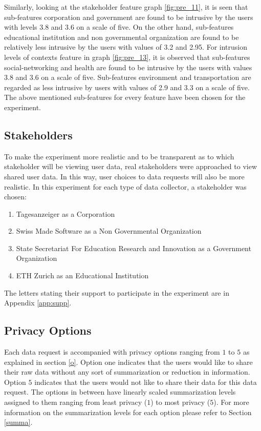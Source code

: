 Similarly, looking at the stakeholder feature graph \ref{fig:pre_11}, it is seen that sub-features  corporation and government are found to be intrusive by the users with levels 3.8 and 3.6 on a scale of five. On the other hand, sub-features educational institution and non governmental organization are found to be relatively less intrusive by the users with values of 3.2 and 2.95. For intrusion levels of contexts feature in graph \ref{fig:pre_13}, it is observed that sub-features social-networking and health are found to be intrusive by the users with values 3.8 and 3.6 on a scale of five. Sub-features environment and
transportation are regarded as less intrusive by users with values of 2.9 and 3.3 on a scale of five. The above mentioned sub-features for every feature have been chosen for the experiment.

\subsection{Stakeholders} \label{stk}

To make the experiment more realistic and to be transparent as to which stakeholder will be viewing user data, real stakeholders were approached to view shared user data. In this way, user choices to data requests will also be more realistic. In this experiment for each type of data collector, a stakeholder was chosen:
\begin{enumerate}
    \item Tagesanzeiger as a Corporation
    \item Swiss Made Software as a Non Governmental Organization
    \item State Secretariat For Education Research and Innovation as a Government Organization
    \item ETH Zurich as an Educational Institution
\end{enumerate}

The letters stating their support to participate in the experiment are in Appendix \ref{app:supp}.

\subsection{Privacy Options} \label{options}

Each data request is accompanied with privacy options ranging from $1$ to $5$ as explained in section \ref{o}. Option one indicates that the users would like to
share their raw data without any sort of summarization or reduction in information. Option $5$ indicates that the users would not like to share their data for this data request.
The options in between have linearly scaled summarization levels assigned to them ranging from least privacy ($1$) to most privacy ($5$). For more information on the summarization levels for each option please refer to Section \ref{summa}. 

